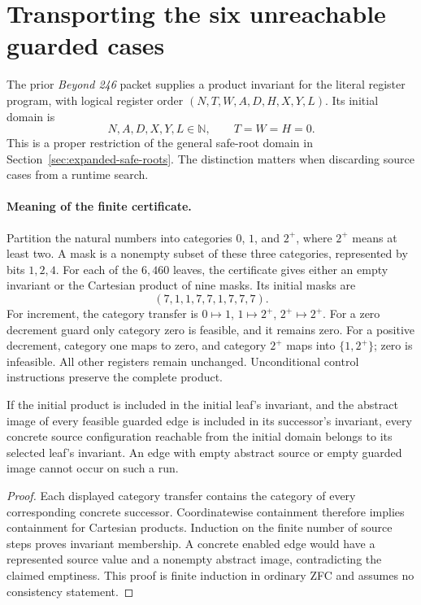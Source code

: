 \section{Transporting the six unreachable guarded cases}
\label{sec:guard-invariant-transport}

The prior \emph{Beyond 246} packet supplies a product invariant for the
literal register program, with logical register order
$(N,T,W,A,D,H,X,Y,L)$.  Its initial domain is
\[
 N,A,D,X,Y,L\in\mathbb N,\qquad T=W=H=0.
\]
This is a proper restriction of the general safe-root domain in
Section~\ref{sec:expanded-safe-roots}.  The distinction matters when
discarding source cases from a runtime search.

\paragraph{Meaning of the finite certificate.}
Partition the natural numbers into categories $0$, $1$, and $2^+$,
where $2^+$ means at least two.  A mask is a nonempty subset of these
three categories, represented by bits $1,2,4$.  For each of the
$6,460$ leaves, the certificate gives either an empty invariant or
the Cartesian product of nine masks.  Its initial masks are
\[
 (7,1,1,7,7,1,7,7,7).
\]
For increment, the category transfer is
$0\mapsto1$, $1\mapsto2^+$, $2^+\mapsto2^+$.
For a zero decrement guard only category zero is feasible, and it
remains zero.  For a positive decrement, category one maps to zero,
and category $2^+$ maps into $\{1,2^+\}$; zero is infeasible.
All other registers remain unchanged.  Unconditional control
instructions preserve the complete product.

\begin{lemma}
If the initial product is included in the initial leaf's invariant,
and the abstract image of every feasible guarded edge is included
in its successor's invariant, every concrete source configuration
reachable from the initial domain belongs to its selected leaf's
invariant.  An edge with empty abstract source or empty guarded image
cannot occur on such a run.
\end{lemma}
\begin{proof}
Each displayed category transfer contains the category of every
corresponding concrete successor.  Coordinatewise containment therefore
implies containment for Cartesian products.  Induction on the finite
number of source steps proves invariant membership.  A concrete
enabled edge would have a represented source value and a nonempty
abstract image, contradicting the claimed emptiness.  This proof is
finite induction in ordinary ZFC and assumes no consistency statement.
\end{proof}

